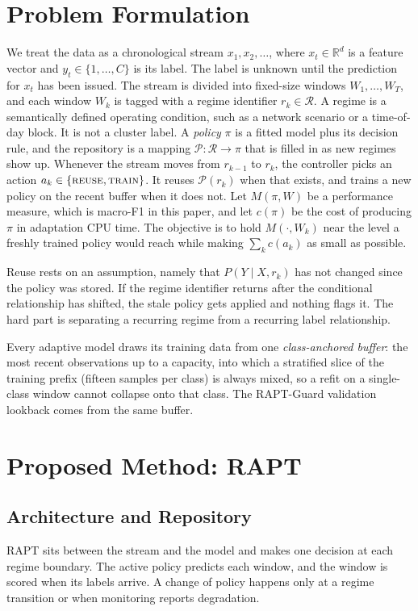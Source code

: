 \documentclass[conference]{IEEEtran}
\begin{document}
\section{Problem Formulation}


We treat the data as a chronological stream $x_1, x_2, \dots$, where
$x_t \in \mathbb{R}^d$ is a feature vector and $y_t \in \{1,\dots,C\}$ is its label. The
label is unknown until the prediction for $x_t$ has been issued. The stream is divided
into fixed-size windows $W_1, \dots, W_T$, and each window $W_k$ is tagged with a regime
identifier $r_k \in \mathcal{R}$. A regime is a semantically defined operating
condition, such as a network scenario or a time-of-day block. It is not a cluster label.
A \emph{policy} $\pi$ is a fitted model plus its decision rule, and the repository is a
mapping $\mathcal{P}: \mathcal{R} \rightarrow \pi$ that is filled in as new regimes show
up. Whenever the stream moves from $r_{k-1}$ to $r_k$, the controller picks an action
$a_k \in \{\textsc{reuse}, \textsc{train}\}$. It reuses $\mathcal{P}(r_k)$ when that
exists, and trains a new policy on the recent buffer when it does not. Let $M(\pi, W)$
be a performance measure, which is macro-F1 in this paper, and let $c(\pi)$ be the cost
of producing $\pi$ in adaptation CPU time. The objective is to hold $M(\cdot, W_k)$ near
the level a freshly trained policy would reach while making $\sum_k c(a_k)$ as small as
possible.


Reuse rests on an assumption, namely that $P(Y \mid X, r_k)$ has not changed since the
policy was stored. If the regime identifier returns after the conditional relationship
has shifted, the stale policy gets applied and nothing flags it. The hard part is
separating a recurring regime from a recurring label relationship.

Every adaptive model draws its training data from one \emph{class-anchored buffer}: the
most recent observations up to a capacity, into which a stratified slice of the training
prefix (fifteen samples per class) is always mixed, so a refit on a single-class window
cannot collapse onto that class. The RAPT-Guard validation lookback comes from the same
buffer.


\section{Proposed Method: RAPT}
\label{sec:method}


\subsection{Architecture and Repository}
RAPT sits between the stream and the model and makes one decision at each regime
boundary. The active policy predicts each window, and the window is scored when its
labels arrive. A change of policy happens only at a regime transition or when
monitoring reports degradation.
\end{document}
